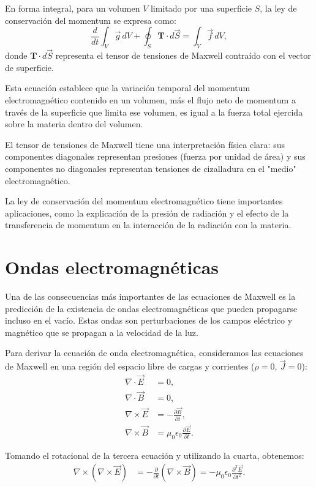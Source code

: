\documentclass[12pt,a4paper]{book}
\begin{document}
En forma integral, para un volumen $V$ limitado por una superficie $S$, la ley de conservación del momentum se expresa como:
\begin{equation}
\frac{d}{dt}\int_V \vec{g} \, dV + \oint_S \mathbf{T} \cdot d\vec{S} = \int_V \vec{f} \, dV,
\end{equation}
donde $\mathbf{T} \cdot d\vec{S}$ representa el tensor de tensiones de Maxwell contraído con el vector de superficie.

Esta ecuación establece que la variación temporal del momentum electromagnético contenido en un volumen, más el flujo neto de momentum a través de la superficie que limita ese volumen, es igual a la fuerza total ejercida sobre la materia dentro del volumen.

El tensor de tensiones de Maxwell tiene una interpretación física clara: sus componentes diagonales representan presiones (fuerza por unidad de área) y sus componentes no diagonales representan tensiones de cizalladura en el "medio" electromagnético.

La ley de conservación del momentum electromagnético tiene importantes aplicaciones, como la explicación de la presión de radiación y el efecto de la transferencia de momentum en la interacción de la radiación con la materia.

\section{Ondas electromagnéticas}

Una de las consecuencias más importantes de las ecuaciones de Maxwell es la predicción de la existencia de ondas electromagnéticas que pueden propagarse incluso en el vacío. Estas ondas son perturbaciones de los campos eléctrico y magnético que se propagan a la velocidad de la luz.

Para derivar la ecuación de onda electromagnética, consideramos las ecuaciones de Maxwell en una región del espacio libre de cargas y corrientes ($\rho = 0$, $\vec{J} = 0$):
\begin{align}
\nabla \cdot \vec{E} &= 0, \\
\nabla \cdot \vec{B} &= 0, \\
\nabla \times \vec{E} &= -\frac{\partial \vec{B}}{\partial t}, \\
\nabla \times \vec{B} &= \mu_0 \epsilon_0 \frac{\partial \vec{E}}{\partial t}.
\end{align}

Tomando el rotacional de la tercera ecuación y utilizando la cuarta, obtenemos:
\begin{align}
\nabla \times (\nabla \times \vec{E}) &= -\frac{\partial}{\partial t}(\nabla \times \vec{B}) = -\mu_0 \epsilon_0 \frac{\partial^2 \vec{E}}{\partial t^2}.
\end{align}
\end{document}
